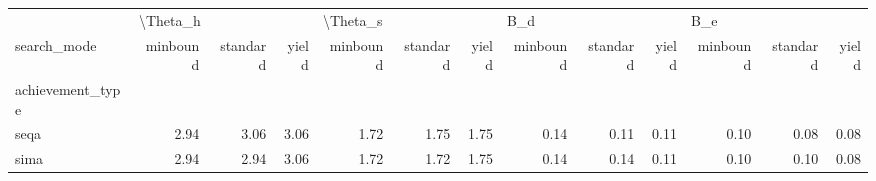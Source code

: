 \begin{tabular}{lrrrrrrrrrrrr}
\toprule
{} & \multicolumn{3}{l}{\textbackslash Theta\_h} & \multicolumn{3}{l}{\textbackslash Theta\_s} & \multicolumn{3}{l}{B\_d} & \multicolumn{3}{l}{B\_e} \\
search\_mode & minbound & standard & yield & minbound & standard & yield & minbound & standard & yield & minbound & standard & yield \\
achievement\_type &          &          &       &          &          &       &          &          &       &          &          &       \\
\midrule
seqa             &     2.94 &     3.06 &  3.06 &     1.72 &     1.75 &  1.75 &     0.14 &     0.11 &  0.11 &     0.10 &     0.08 &  0.08 \\
sima             &     2.94 &     2.94 &  3.06 &     1.72 &     1.72 &  1.75 &     0.14 &     0.14 &  0.11 &     0.10 &     0.10 &  0.08 \\
\bottomrule
\end{tabular}
